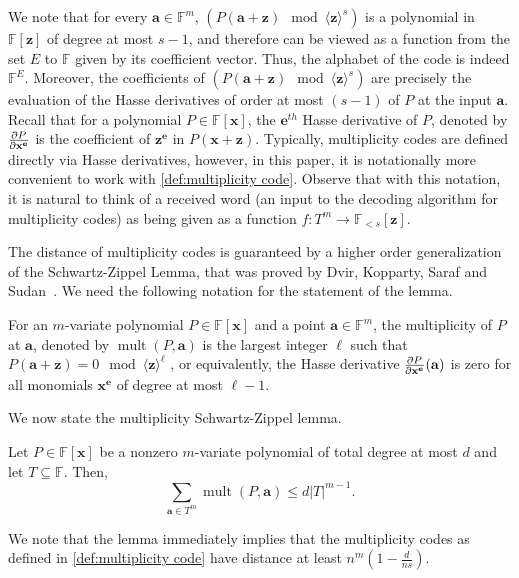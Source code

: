 \documentclass{theoretics}
\def\Field{\mathbb{F}}
\let\F\Field
\def\abs#1{\left| #1 \right|}
\def\veca{\mathbf{a}}
\def\vece{\mathbf{e}}
\def\vecx{\mathbf{x}}
\def\vecz{\mathbf{z}}
\newcommand{\hpartial}{{\mathchar'26\mkern-10mu \partial}}
\newcommand{\mult}{\operatorname{mult}}
\newcommand{\vz}{\vecz}
\newcommand{\vx}{\vecx}
\newcommand{\ve}{\vece}
\newcommand{\va}{\veca}
\begin{document}
	\begin{remark}We note that for every $\va \in \F^m$, $\left( P(\va + \vz) \mod
		\langle \vz \rangle^s \right)$ is a polynomial in $\F[\vz]$ of
		degree at most $s-1$, and therefore can be viewed as a function from the
		set $E$ to $\F$ given by its coefficient vector. Thus, the alphabet of
		the code is indeed $\F^E$. Moreover, the coefficients of $\left( P(\va
		+ \vz) \mod \langle \vz \rangle^s \right)$ are precisely the
		evaluation of the Hasse derivatives of order at most $(s-1)$ of $P$ at
		the input $\va$. Recall that for a polynomial $P \in \mathbb{F}[\vx]$,
		the $\ve^{th}$ Hasse derivative of $P$, denoted by $\frac{\hpartial
			P}{\hpartial \vx^{\ve}}$ is the coefficient of $\vz^{\ve}$ in
		$P(\vx+\vz)$. Typically, multiplicity codes are defined directly via
		Hasse derivatives, however, in this paper, it is notationally more
		convenient to work with \cref{def:multiplicity code}. Observe that
		with this notation, it is natural to think of a received word (an
		input to the decoding algorithm for multiplicity codes) as being given
		as a function $f\colon T^m \to \F_{<s}[\vz]$. 
	\end{remark}
	
	The distance of multiplicity codes is guaranteed by a higher order
	generalization of the Schwartz-Zippel Lemma, that was proved by Dvir,
	Kopparty, Saraf and Sudan~\cite{DvirKSS2013}. We need the following
	notation for the statement of the lemma.
	\begin{definition} For an $m$-variate
		polynomial $P \in \F[\vx]$ and a point $\va \in \F^m$, the
		multiplicity of $P$ at $\va$, denoted by $\mult(P, \va)$ is the
		largest integer $\ell$ such that $P(\va + \vz) = 0 \mod \langle \vz
		\rangle^{\ell}$ , or equivalently, the Hasse derivative
		$\frac{\hpartial P}{\hpartial \vx^{\ve}}(\va)$ is zero for all
		monomials $\vx^{\ve}$ of degree at most $\ell -1$.
	\end{definition}
	
	We now state the multiplicity Schwartz-Zippel lemma. 
	
	\begin{lemma}
		Let $P \in \F[\vx]$ be a nonzero $m$-variate polynomial of total degree at most $d$ and let $T \subseteq \F$. Then, \[ \sum_{\va \in T^m} \mult(P, \va) \leq d  \abs{T}^{m-1}.\] 
	\end{lemma}
	We note that the lemma immediately implies that the multiplicity codes
	as defined in \cref{def:multiplicity code} have distance at least $n^m
	(1-\frac{d}{ns})$.
	
\end{document}
